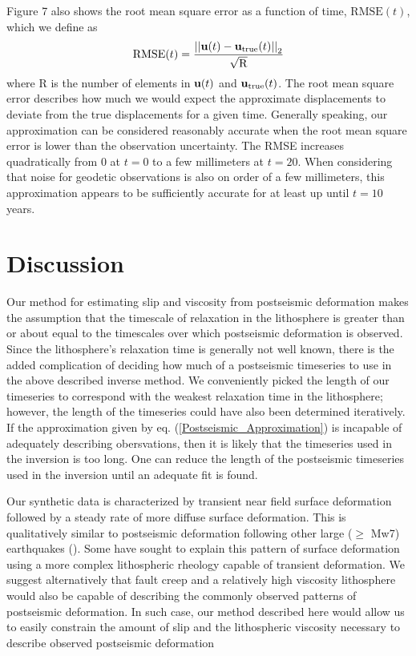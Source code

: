 \documentclass[12pt]{article}
\begin{document}
Figure 7 also shows the root mean square error as
a function of time, $\mathrm{RMSE}(t)$, which we define as
\begin{equation}
  \mathrm{RMSE}(t) = \frac{\left|\left|\bold{u}(t) -
    \bold{u}_{\mathrm{true}}(t)\right|\right|_2}{\sqrt{\mathrm{R}}}
\end{equation}
where R is the number of elements in $\bold{u}(t)$ and
$\bold{u}_{\mathrm{true}}(t)$.  The root mean square error describes
how much we would expect the approximate displacements to deviate from
the true displacements for a given time.  Generally speaking, our
approximation can be considered reasonably accurate when the root mean square error
is lower than the observation uncertainty.  The RMSE increases
quadratically from 0 at $t=0$ to a few millimeters at $t=20$.  When
considering that noise for geodetic observations is also on order of a
few millimeters, this approximation appears to be sufficiently
accurate for at least up until $t=10$ years.


\section{Discussion}

Our method for estimating slip and viscosity from postseismic
deformation makes the assumption that the timescale of relaxation in
the lithosphere is greater than or about equal to the timescales over
which postseismic deformation is observed.  Since the lithosphere's
relaxation time is generally not well known, there is the added
complication of deciding how much of a postseismic timeseries to use
in the above described inverse method.  We conveniently picked the
length of our timeseries to correspond with the weakest relaxation
time in the lithosphere; however, the length of the timeseries could
have also been determined iteratively.  If the approximation given by
eq. (\ref{Postseismic_Approximation}) is incapable of adequately
describing obersvations, then it is likely that the timeseries used in
the inversion is too long.  One can reduce the length of the
postseismic timeseries used in the inversion until an adequate fit is
found.

Our synthetic data is characterized by transient near field surface
deformation followed by a steady rate of more diffuse surface
deformation.  This is qualitatively similar to postseismic
deformation following other large ($\geq$ Mw7) earthquakes
(\citep{P2003,P2005,R2007,R2015}).  Some have sought to explain this
pattern of surface deformation using a more complex lithospheric
rheology capable of transient deformation. We suggest
alternatively that fault creep and a relatively high viscosity
lithosphere would also be capable of describing the commonly observed
patterns of postseismic deformation.  In such case, our method
described here would allow us to easily constrain the amount of slip
and the lithospheric viscosity necessary to describe observed
postseismic deformation
\end{document}

